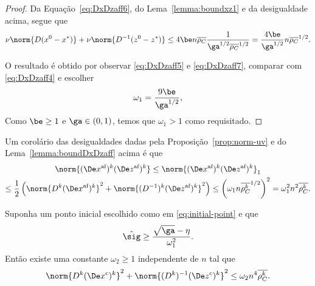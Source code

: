 \begin{proof}
Da Equação~\eqref{eq:DxDzaff6}, do Lema~\ref{lemma:boundxz1} e da desigualdade acima, segue que 
\begin{equation} \label{eq:DxDzaff7}
 \nu \norm{D(\xzero - \xstar)} + \nu \norm{D^{-1}(\zzero - \zstar)}  \leq 4\be n \dbvec{\rho_C} \frac{1}{\ga^{1/2}\dbvec{\rho_{C}}^{1/2}} = \frac{4\be}{\ga^{1/2}}n\dbvec{\rho_C}^{1/2}.
\end{equation}

O resultado é obtido por observar \eqref{eq:DxDzaff5} e \eqref{eq:DxDzaff7}, comparar com \eqref{eq:DxDzaff4} e escolher 
\begin{equation}
	\label{eq:omega1}
	\omega_1 = \frac{9\be}{\ga^{1/2}},
\end{equation}
Como $\be\geq1$ e $\ga\in(0,1)$, temos que $\omega_1>1$ como requisitado.
\end{proof}

Um corolário  das desigualdades dadas pela Proposição~\ref{prop:norm-uv} e do Lema~\ref{lemma:boundDxDzaff} acima é que 
\begin{multline}
\label{eq:normDxDzaff}
	\norm{(\dex)^{k}(\dez)^{k}} \leq \norm{(\dex)^{k}(\dez)^{k}}_{1}  \\ \leq \frac{1}{2}\left(\norm{D^{k}(\dex)^{k}}^{2} + \norm{(D^{-1})^{k}(\dez)^{k}}^{2}\right)
  					 \leq \left(\omega_1 n\dbvec{\rho_C^{k}}^{1/2}\right)^{2}
  					 = \omega_1^{2} n^{2}\dbvec{\rho_C^{k}}.
\end{multline}

\begin{lema}\label{lemma:boundDxDzc}
	Suponha um ponto inicial escolhido como em \eqref{eq:initial-point} e que \begin{equation}
	\label{eq:sig-eta-relation}
	\nextsig \geq \frac{\sqrt{\ga} - \eta}{\omega_1^{2}}.
\end{equation} Então existe uma constante $\omega_2\geq1$  independente de $n$ tal que 
	\begin{equation}\label{eq:lemma-boundDxDzcx}
		\norm{D^{k}(\Decox)^{k}}^{2} + \norm{(D^{k})^{-1}(\Decoz)^{k}}^{2} \leq \omega_2 n^{4}\dbvec{\rho_C^{k}}.
	\end{equation}
\end{lema}



